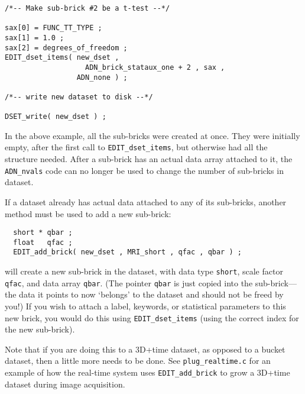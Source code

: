 \begin{verbatim}
/*-- Make sub-brick #2 be a t-test --*/

sax[0] = FUNC_TT_TYPE ;
sax[1] = 1.0 ;
sax[2] = degrees_of_freedom ;
EDIT_dset_items( new_dset ,
                   ADN_brick_stataux_one + 2 , sax ,
                 ADN_none ) ;

/*-- write new dataset to disk --*/

DSET_write( new_dset ) ;
\end{verbatim}

In the above example, all the sub-bricks were created at once.
They were initially empty, after the first call to
{\tt EDIT\_dset\_items}, but otherwise had all the structure
needed.  After a sub-brick has an actual data array attached
to it, the {\tt ADN\_nvals} code can no longer be used to
change the number of sub-bricks in dataset.

If a dataset already has actual data attached to any of its
sub-bricks, another method must be used to add a new sub-brick:
\begin{verbatim}
  short * qbar ;
  float   qfac ;
  EDIT_add_brick( new_dset , MRI_short , qfac , qbar ) ;
\end{verbatim}
will create a new sub-brick in the dataset, with data
type {\tt short}, scale factor {\tt qfac}, and data
array {\tt qbar}.  (The pointer {\tt qbar} is just
copied into the sub-brick---the data it points to
now `belongs' to the dataset and should not be freed
by you!)  If you wish to attach a label, keywords, or
statistical parameters to this new brick, you would
do this using {\tt EDIT\_dset\_items} (using the
correct index for the new sub-brick).

Note that if you are doing this to a 3D+time dataset,
as opposed to a bucket dataset, then a little more
needs to be done.  See {\tt plug\_realtime.c} for
an example of how the \afnit real-time system uses
{\tt EDIT\_add\_brick} to grow a 3D+time dataset
during image acquisition.

